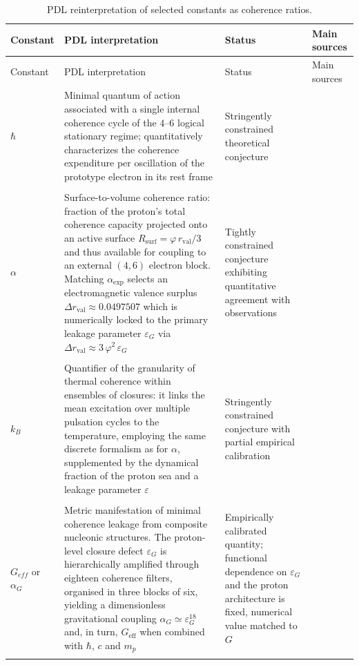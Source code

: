 \documentclass[11pt,a4paper]{article}
\begin{document}
\begin{longtable}{@{}L{1.5cm}L{7.3cm}L{4.2cm}p{1.8cm}@{}}
  \caption{PDL reinterpretation of selected constants as coherence ratios.}
  \label{tab:constants_status}\\

  \toprule
  Constant & PDL interpretation & Status & Main sources \\
  \midrule
  \endfirsthead

  \toprule
  Constant & PDL interpretation & Status & Main sources \\
  \midrule
  \endhead

  \bottomrule
  \endfoot

  $\hbar$ &
  Minimal quantum of action associated with a single internal coherence cycle of the $4$--$6$ logical stationary regime; quantitatively characterizes the coherence expenditure per oscillation of the prototype electron in its rest frame &
  Stringently constrained theoretical conjecture &
  \citep{PDL_Main_2026,PDL_intro,PDL_position} \\\\[0.4em]

  $\alpha$ & 
  Surface-to-volume coherence ratio: fraction of the proton's total coherence capacity projected onto an active surface $R_{\text{surf}}=\varphi\, r_{\text{val}}/3$ and thus available for coupling to an external $(4,6)$ electron block. Matching $\alpha_{\text{exp}}$ selects an electromagnetic valence surplus $\Delta r_{\text{val}} \approx 0.0497507$ which is numerically locked to the primary leakage parameter $\varepsilon_G$ via $\Delta r_{\text{val}} \approx 3\,\varphi^2\,\varepsilon_G$ & Tightly constrained conjecture exhibiting quantitative agreement with observations 
  &
\cite{Alpha_PDL_v2_2026,Universal_Coherence_Leakage_V3_2026} \\\\[0.4em]

  $k_B$ &
  Quantifier of the granularity of thermal coherence within ensembles of closures: it links the mean excitation over multiple pulsation cycles to the temperature, employing the same discrete formalism as for $\alpha$, supplemented by the dynamical fraction of the proton sea and a leakage parameter $\varepsilon$ &
  Stringently constrained conjecture with partial empirical calibration &
  \citep{PDL_Main_2026,Coherence_Leakage_18_2026,PDL_position} \\\\[0.4em]

  $G_{eff}$ or $\alpha_G$ & 
  Metric manifestation of minimal coherence leakage from composite nucleonic structures. The proton-level closure defect $\varepsilon_G$ is hierarchically amplified through eighteen coherence filters, organised in three blocks of six, yielding a dimensionless gravitational coupling $\alpha_G \simeq \varepsilon_G^{18}$ and, in turn, $G_{\text{eff}}$ when combined with $\hbar$, $c$ and $m_p$ & Empirically calibrated quantity; functional dependence on $\varepsilon_G$ and the proton architecture is fixed, numerical value matched to $G$ 
  & \cite{Exponent_18_PDL_2026,Topological_Reformulation_PDL_2026,Universal_Coherence_Leakage_V3_2026} \\\\[0.4em]


\end{longtable}
\end{document}
